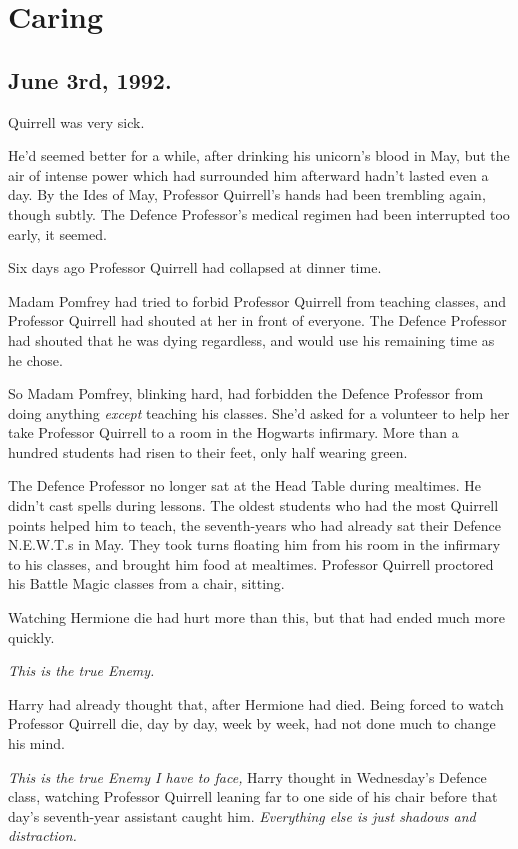\chapter{Caring}

\section{June 3rd, 1992.}

 Quirrell was very sick.

\hplettrineextrapara
He’d seemed better for a while, after drinking his unicorn’s blood in May, but the air of intense power which had surrounded him afterward hadn’t lasted even a day. By the Ides of May, Professor Quirrell’s hands had been trembling again, though subtly. The Defence Professor’s medical regimen had been interrupted too early, it seemed.

Six days ago Professor Quirrell had collapsed at dinner time.

Madam Pomfrey had tried to forbid Professor Quirrell from teaching classes, and Professor Quirrell had shouted at her in front of everyone. The Defence Professor had shouted that he was dying regardless, and would use his remaining time as he chose.

So Madam Pomfrey, blinking hard, had forbidden the Defence Professor from doing anything \emph{except} teaching his classes. She’d asked for a volunteer to help her take Professor Quirrell to a room in the Hogwarts infirmary. More than a hundred students had risen to their feet, only half wearing green.

The Defence Professor no longer sat at the Head Table during mealtimes. He didn’t cast spells during lessons. The oldest students who had the most Quirrell points helped him to teach, the seventh-years who had already sat their Defence N.E.W.T.s in May. They took turns floating him from his room in the infirmary to his classes, and brought him food at mealtimes. Professor Quirrell proctored his Battle Magic classes from a chair, sitting.

Watching Hermione die had hurt more than this, but that had ended much more quickly.

\emph{This is the true Enemy.}

Harry had already thought that, after Hermione had died. Being forced to watch Professor Quirrell die, day by day, week by week, had not done much to change his mind.

\emph{This is the true Enemy I have to face,} Harry thought in Wednesday’s Defence class, watching Professor Quirrell leaning far to one side of his chair before that day’s seventh-year assistant caught him. \emph{Everything else is just shadows and distraction.}

